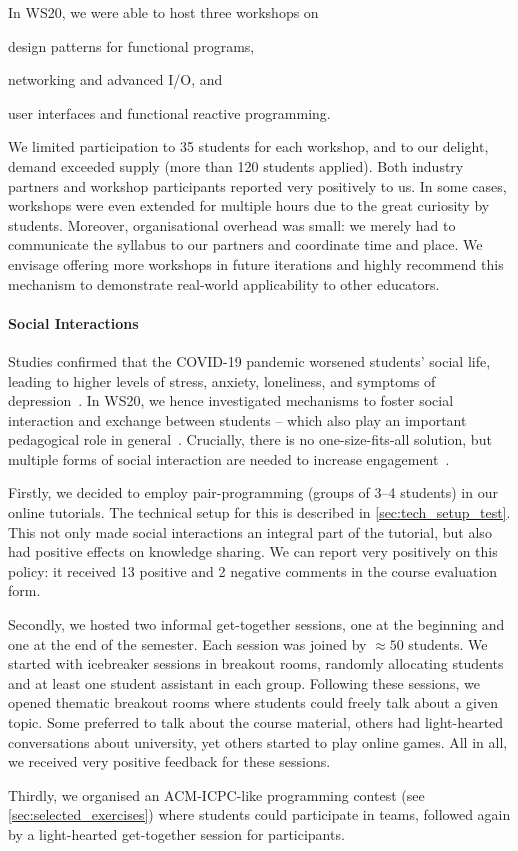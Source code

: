 In WS20,
we were able to host three workshops on
\begin{enumerate*}[label=\arabic*)]
  \item design patterns for functional programs,
  \item networking and advanced I/O, and
  \item user interfaces and functional reactive programming.
\end{enumerate*}
We limited participation to 35 students for each workshop,
and to our delight, demand exceeded supply (more than 120 students applied).
Both industry partners and workshop participants
reported very positively to us.
In some cases,
workshops were even extended for multiple hours due to the great curiosity by students.
Moreover, organisational overhead was small:
we merely had to communicate the syllabus to our partners and coordinate time and place.
We envisage offering more workshops in future iterations and highly recommend this mechanism to demonstrate real-world applicability to other educators.

\paragraph{Social Interactions}
Studies confirmed that the COVID-19 pandemic
worsened students' social life,
leading to higher levels of stress, anxiety, loneliness, and symptoms of depression~\cite{students_lockdown1}.
In WS20,
we hence investigated mechanisms
to foster social interaction and exchange between students
-- which also play an important pedagogical role in general~\cite{impact_social_interaction}.
Crucially,
there is no one-size-fits-all solution,
but multiple forms of social interaction
are needed to increase engagement~\cite{onlineengagement3,onlineengagement2}.

Firstly, we decided to employ pair-programming (groups of 3--4 students)
in our online tutorials.
The technical setup for this is described in \cref{sec:tech_setup_test}.
This not only made social interactions an integral part of the tutorial,
but also had positive effects on knowledge sharing.
We can report very positively on this policy:
it received 13 positive and 2 negative comments in the course evaluation form.

Secondly, we hosted two informal get-together sessions,
one at the beginning and one at the end of the semester.
Each session was joined by $\approx 50$ students.
We started with icebreaker sessions in breakout rooms,
randomly allocating students and at least one student assistant in each group.
Following these sessions,
we opened thematic breakout rooms where students
could freely talk about a given topic.
Some preferred to talk about the course material, others had
light-hearted conversations about university, yet others started to play online games.
All in all, we received very positive feedback for these sessions.

Thirdly, we organised an
ACM-ICPC-like programming contest (see \cref{sec:selected_exercises})
where students could participate in teams,
followed again by a light-hearted get-together session
for participants.


